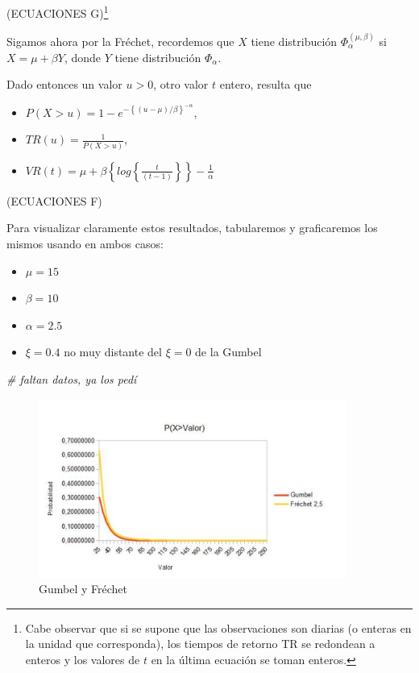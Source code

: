\documentclass[
  oneside]{article}
\newenvironment{Shaded}{\begin{snugshade}}{\end{snugshade}}
\newcommand{\CommentTok}[1]{\textcolor[rgb]{0.56,0.35,0.01}{\textit{#1}}}
\begin{document}
(ECUACIONES
G)\footnote{Cabe observar que si se supone que las observaciones son diarias (o enteras en la unidad que corresponda), los tiempos de retorno TR se redondean a enteros y los valores de $t$ en la última ecuación se toman enteros.}

Sigamos ahora por la Fréchet, recordemos que \(X\) tiene distribución
\(\Phi_{\alpha}^{( \mu,\beta)}\) si \(X= \mu+\beta Y\), donde \(Y\)
tiene distribución \(\Phi_{\alpha}\).

Dado entonces un valor \(u>0\), otro valor \(t\) entero, resulta que

\begin{itemize}
\item $P(X>u)=1-e^{ -\left \{( u- \mu)/\beta\right \}^{-\alpha}}$,
\item $TR(u)=\frac{1}{P(X>u)}$,
\item $VR(t)= \mu+ \beta\left \{log\left \{ \frac{t}{(t-1)}\right \}\right \}-\frac{1}{\alpha}$
\end{itemize}

(ECUACIONES F)

Para visualizar claramente estos resultados, tabularemos y graficaremos
los mismos usando en ambos casos:

\begin{itemize}
\item $\mu=15$
\item $\beta=10$
\item $\alpha=2.5$
\item $\xi=0.4$ no muy distante del $\xi=0$ de la Gumbel
\end{itemize}

\begin{Shaded}
\begin{Highlighting}[]
\CommentTok{\# faltan datos, ya los pedí}
\end{Highlighting}
\end{Shaded}

\begin{figure}
\centering
\includegraphics[width=0.9\textwidth,height=\textheight]{images/p4.png}
\caption{Gumbel y Fréchet}
\end{figure}
\end{document}
